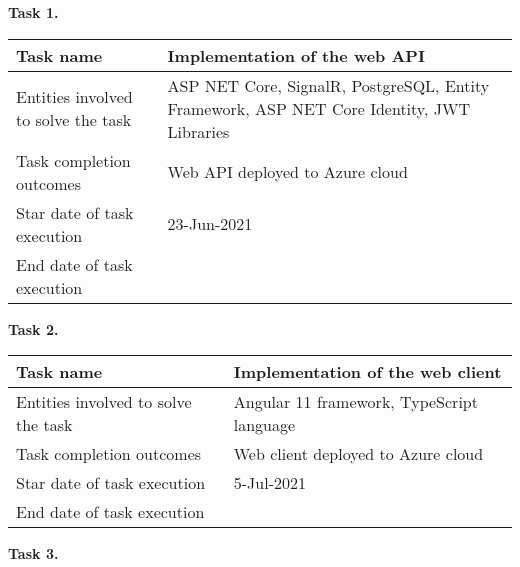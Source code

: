 \begin{description}
    \item \hspace*{8mm}\textbf{Task 1.}\\
    \begin{tabular}{|p{}|p{}|}
        \hline
        Task name                           & Implementation of the web API                                                             \\
        \hline
        Entities involved to solve the task & ASP NET Core, SignalR, PostgreSQL, Entity Framework, ASP NET Core Identity, JWT Libraries \\
        \hline
        Task completion outcomes            & Web API deployed to Azure cloud                                                           \\
        \hline
        Star date of task execution         & 23-Jun-2021                                                                               \\
        \hline
        End date of task execution          &                                                                                           \\
        \hline
    \end{tabular}
    \item \hspace*{8mm}\textbf{Task 2.}\\
    \begin{tabular}{|p{}|p{}|}
        \hline
        Task name                           & Implementation of the web client          \\
        \hline
        Entities involved to solve the task & Angular 11 framework, TypeScript language \\
        \hline
        Task completion outcomes            & Web client deployed to Azure cloud        \\
        \hline
        Star date of task execution         & 5-Jul-2021                                \\
        \hline
        End date of task execution          &                                           \\
        \hline
    \end{tabular}
    \item \hspace*{8mm}\textbf{Task 3.}\\
    \begin{tabular}{|p{}|p{}|}

\end{tabular}
\end{description}
